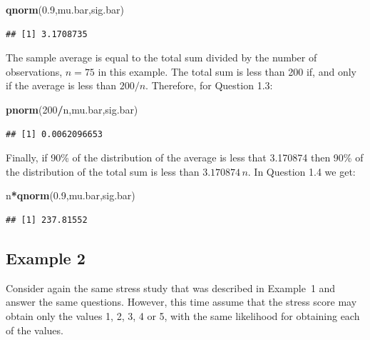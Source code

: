 \documentclass[]{krantz}
\makeatletter
\newenvironment{Shaded}{\begin{snugshade}}{\end{snugshade}}
\newcommand{\KeywordTok}[1]{\textcolor[rgb]{0.13,0.29,0.53}{\textbf{#1}}}
\newcommand{\DecValTok}[1]{\textcolor[rgb]{0.00,0.00,0.81}{#1}}
\newcommand{\FloatTok}[1]{\textcolor[rgb]{0.00,0.00,0.81}{#1}}
\newcommand{\OperatorTok}[1]{\textcolor[rgb]{0.81,0.36,0.00}{\textbf{#1}}}
\newcommand{\NormalTok}[1]{#1}
\newenvironment{kframe}{%
\medskip{}
\setlength{\fboxsep}{.8em}
 \def\at@end@of@kframe{}%
 \ifinner\ifhmode%
  \def\at@end@of@kframe{\end{minipage}}%
  \begin{minipage}{\columnwidth}%
 \fi\fi%
 \def\FrameCommand##1{\hskip\@totalleftmargin \hskip-\fboxsep
 \colorbox{shadecolor}{##1}\hskip-\fboxsep
     \hskip-\linewidth \hskip-\@totalleftmargin \hskip\columnwidth}%
 \MakeFramed {\advance\hsize-\width
   \@totalleftmargin\z@ \linewidth\hsize
   \@setminipage}}%
 {\par\unskip\endMakeFramed%
 \at@end@of@kframe}
\renewenvironment{Shaded}{\begin{kframe}}{\end{kframe}}
\theoremstyle{definition}
\theoremstyle{definition}
\theoremstyle{definition}
\theoremstyle{remark}
\makeatother
\begin{document}
\begin{Shaded}
\begin{Highlighting}[]
\KeywordTok{qnorm}\NormalTok{(}\FloatTok{0.9}\NormalTok{,mu.bar,sig.bar)}
\end{Highlighting}
\end{Shaded}

\begin{verbatim}
## [1] 3.1708735
\end{verbatim}

The sample average is equal to the total sum divided by the number of
observations, \(n=75\) in this example. The total sum is less than 200
if, and only if the average is less than \(200/n\). Therefore, for
Question 1.3:

\begin{Shaded}
\begin{Highlighting}[]
\KeywordTok{pnorm}\NormalTok{(}\DecValTok{200}\OperatorTok{/}\NormalTok{n,mu.bar,sig.bar)}
\end{Highlighting}
\end{Shaded}

\begin{verbatim}
## [1] 0.0062096653
\end{verbatim}

Finally, if 90\% of the distribution of the average is less that
3.170874 then 90\% of the distribution of the total sum is less than
\(3.170874\, n\). In Question 1.4 we get:

\begin{Shaded}
\begin{Highlighting}[]
\NormalTok{n}\OperatorTok{*}\KeywordTok{qnorm}\NormalTok{(}\FloatTok{0.9}\NormalTok{,mu.bar,sig.bar)}
\end{Highlighting}
\end{Shaded}

\begin{verbatim}
## [1] 237.81552
\end{verbatim}

\subsection{Example 2}\label{example-2}

Consider again the same stress study that was described in Example~1 and
answer the same questions. However, this time assume that the stress
score may obtain only the values 1, 2, 3, 4 or 5, with the same
likelihood for obtaining each of the values.
\end{document}
